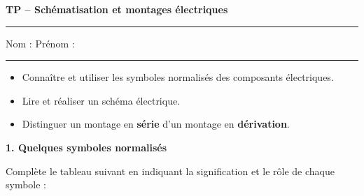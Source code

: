 \documentclass[11pt,a4paper]{article}
\begin{document}
\begin{center}
  {\LARGE\textbf{TP -- Schématisation et montages électriques}}
\end{center}

\hrule
\vspace{3mm}
\noindent Nom : \dotfill \quad Prénom : \dotfill
\vspace{3mm}
\hrule
\vspace{5mm}

\begin{tcolorbox}[colback=blue!5!white, colframe=blue!60!black, title=\textbf{Objectifs}]
\begin{itemize}
  \item Connaître et utiliser les symboles normalisés des composants électriques.
  \item Lire et réaliser un schéma électrique.
  \item Distinguer un montage en \textbf{série} d'un montage en \textbf{dérivation}.
\end{itemize}
\end{tcolorbox}

\vspace{5mm}


\textbf{\large 1. Quelques symboles normalisés}

\vspace{3mm}

Complète le tableau suivant en indiquant la signification et le rôle de chaque symbole :

\vspace{3mm}
\end{document}
